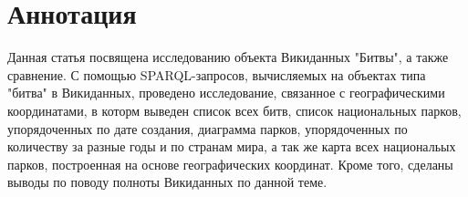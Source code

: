 \section{Аннотация}

Данная статья посвящена исследованию объекта Викиданных "Битвы", а также сравнение. С помощью SPARQL-запросов, вычисляемых на объектах типа "битва" в Викиданных, проведено исследование, связанное с географическими координатами, в которм выведен список всех битв, список национальных парков, упорядоченных по дате создания, диаграмма парков, упорядоченных по количеству за разные годы и по странам мира, а так же карта всех национальых парков, построенная на основе географических координат. Кроме того, сделаны выводы по поводу полноты Викиданных по данной теме.